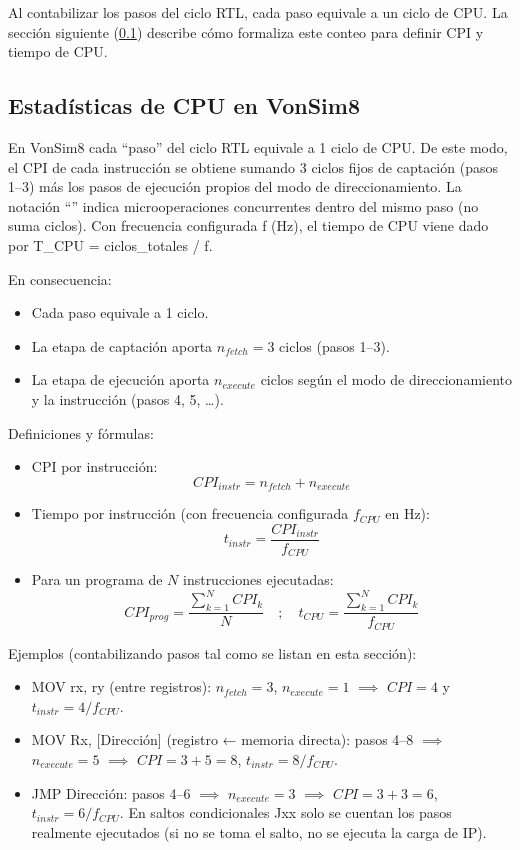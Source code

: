 \documentclass[12pt,oneside]{templates/unerthesis}
\providecommand{\tightlist}{%
  \setlength{\itemsep}{0pt}\setlength{\parskip}{0pt}}
\begin{document}
Al contabilizar los pasos del ciclo RTL, cada paso equivale a un ciclo de CPU. La sección siguiente (\ref{estaCPU}) describe cómo formaliza este conteo para definir CPI y tiempo de CPU.

\hypertarget{estaCPU}{%
\subsection{Estadísticas de CPU en VonSim8}\label{estaCPU}}

En VonSim8 cada ``paso'' del ciclo RTL equivale a 1 ciclo de CPU. De este modo, el CPI de cada instrucción se obtiene sumando 3 ciclos fijos de captación (pasos 1--3) más los pasos de ejecución propios del modo de direccionamiento. La notación ``\textbar{}'' indica microoperaciones concurrentes dentro del mismo paso (no suma ciclos). Con frecuencia configurada f (Hz), el tiempo de CPU viene dado por T\_CPU = ciclos\_totales / f.

En consecuencia:

\begin{itemize}
\tightlist
\item
  Cada paso equivale a 1 ciclo.
\item
  La etapa de captación aporta \(n_{fetch}=3\) ciclos (pasos 1--3).
\item
  La etapa de ejecución aporta \(n_{execute}\) ciclos según el modo de direccionamiento y la instrucción (pasos 4, 5, \ldots).
\end{itemize}

Definiciones y fórmulas:

\begin{itemize}
\tightlist
\item
  CPI por instrucción: \[CPI_{instr} = n_{fetch} + n_{execute}\]
\item
  Tiempo por instrucción (con frecuencia configurada \(f_{CPU}\) en Hz):
  \[t_{instr} = \frac{CPI_{instr}}{f_{CPU}}\]
\item
  Para un programa de \(N\) instrucciones ejecutadas:
  \[CPI_{prog} = \frac{\sum_{k=1}^{N} CPI_k}{N} \quad;\quad t_{CPU} = \frac{\sum_{k=1}^{N} CPI_k}{f_{CPU}}\]
\end{itemize}

Ejemplos (contabilizando pasos tal como se listan en esta sección):

\begin{itemize}
\item
  MOV rx, ry (entre registros): \(n_{fetch}=3\), \(n_{execute}=1\) \(\implies\) \(CPI=4\) y \(t_{instr}=4/f_{CPU}\).
\item
  MOV Rx, {[}Dirección{]} (registro ← memoria directa): pasos 4--8 \(\implies\) \(n_{execute}=5\) \(\implies\) \(CPI=3+5=8\), \(t_{instr}=8/f_{CPU}\).
\item
  JMP Dirección: pasos 4--6 \(\implies\) \(n_{execute}=3\) \(\implies\) \(CPI=3+3=6\), \(t_{instr}=6/f_{CPU}\). En saltos condicionales Jxx solo se cuentan los pasos realmente ejecutados (si no se toma el salto, no se ejecuta la carga de IP).
\end{itemize}
\end{document}
